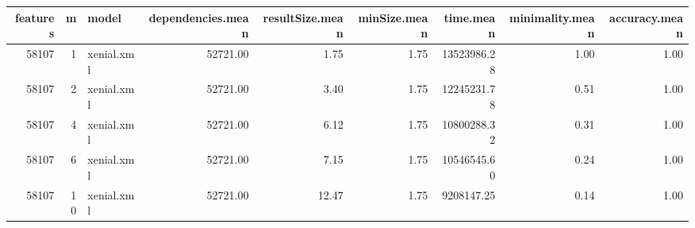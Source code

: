 \begin{table}[ht]
\centering
\begin{tabular}{rrlrrrrrr}
  \hline
features & m & model & dependencies.mean & resultSize.mean & minSize.mean & time.mean & minimality.mean & accuracy.mean \\ 
  \hline
58107 &   1 & xenial.xml & 52721.00 & 1.75 & 1.75 & 13523986.28 & 1.00 & 1.00 \\ 
  58107 &   2 & xenial.xml & 52721.00 & 3.40 & 1.75 & 12245231.78 & 0.51 & 1.00 \\ 
  58107 &   4 & xenial.xml & 52721.00 & 6.12 & 1.75 & 10800288.32 & 0.31 & 1.00 \\ 
  58107 &   6 & xenial.xml & 52721.00 & 7.15 & 1.75 & 10546545.60 & 0.24 & 1.00 \\ 
  58107 &  10 & xenial.xml & 52721.00 & 12.47 & 1.75 & 9208147.25 & 0.14 & 1.00 \\ 
   \hline
\end{tabular}
\end{table}
